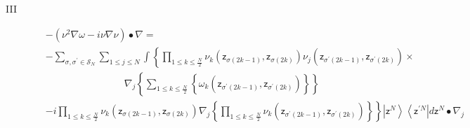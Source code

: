 \documentclass[aps,preprint]{revtex4}%
\begin{document}
\begin{description}
\item[III]
\begin{align}
&  -\left(  \nu^{2}\nabla\omega-i\nu\nabla\nu\right)  \bullet\nabla\left.
=\right. \nonumber\\
&  -%
{\textstyle\sum\limits_{\sigma,\sigma^{\prime}\in\mathcal{S}_{N}}}
{\displaystyle\sum\limits_{1\leq j\leq N}}
\int\left\{
{\displaystyle\prod\limits_{1\leq k\leq\frac{N}{2}}}
\nu_{k}\left(  \mathsf{z}_{\sigma\left(  2k-1\right)  },\mathsf{z}%
_{\sigma\left(  2k\right)  }\right)  \nu_{j}\left(  \mathsf{z}_{\sigma
^{\prime}\left(  2k-1\right)  },\mathsf{z}_{\sigma^{\prime}\left(  2k\right)
}\right)  \right.  \times\nonumber\\
&  \qquad\qquad\qquad\qquad\nabla_{j}\left\{
{\displaystyle\sum\limits_{1\leq k\leq\frac{N}{2}}}
\left\{  \omega_{k}\left(  \mathsf{z}_{\sigma^{\prime}\left(  2k-1\right)
},\mathsf{z}_{\sigma^{\prime}\left(  2k\right)  }\right)  \right\}  \right\}
\nonumber\\
&  \left.  -i%
{\displaystyle\prod\limits_{1\leq k\leq\frac{N}{2}}}
\nu_{k}\left(  \mathsf{z}_{\sigma\left(  2k-1\right)  },\mathsf{z}%
_{\sigma\left(  2k\right)  }\right)  \nabla_{j}\left\{
{\displaystyle\prod\limits_{1\leq k\leq\frac{N}{2}}}
\nu_{k}\left(  \mathsf{z}_{\sigma^{\prime}\left(  2k-1\right)  }%
,\mathsf{z}_{\sigma^{\prime}\left(  2k\right)  }\right)  \right\}  \right\}
\left\vert \mathsf{z}^{N}\right\rangle \left\langle \mathsf{z}^{\prime
N}\right\vert d\mathsf{z}^{N}\bullet\nabla_{j}%
\end{align}



\end{description}
\end{document}
